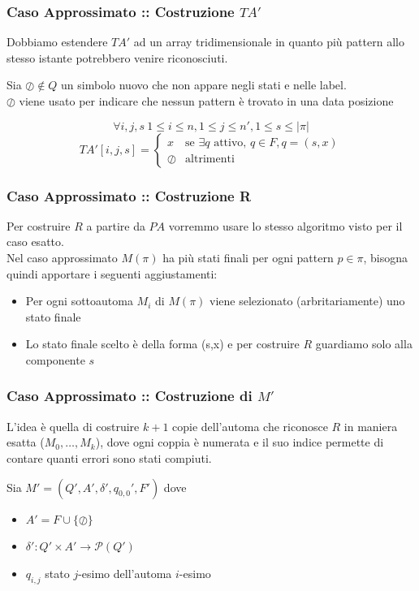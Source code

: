 \documentclass{beamer}
\begin{document}
\begin{frame}
\frametitle{Caso Approssimato :: Costruzione $TA'$}
Dobbiamo estendere $TA'$ ad un array tridimensionale in quanto più pattern allo stesso istante potrebbero venire riconosciuti.\\
\begin{definition}
Sia $\oslash \not\in Q$ un simbolo nuovo che non appare negli stati e nelle label. \\
$\oslash$ viene usato per indicare che nessun pattern è trovato in una data posizione
\end{definition}

\begin{equation*}
\forall  i,j,s\ 1\leq i \leq n, 1 \leq j \leq n',1 \leq s \leq |\pi|
\end{equation*}
\begin{equation*}
TA'[i,j,s]= 
\begin{cases} 
x & \text{se $\exists q$ attivo, $q\in F, q = (s,x)$}
\\
\oslash  &\text{altrimenti}
\end{cases}
\end{equation*}
\end{frame}


\begin{frame}
\frametitle{Caso Approssimato :: Costruzione R}

Per costruire $R$ a partire da $PA$ vorremmo usare lo stesso algoritmo visto per il caso esatto.\\
Nel caso approssimato $M(\pi)$ ha più stati finali per ogni pattern $p \in \pi$, bisogna quindi apportare i seguenti aggiustamenti:
\begin{itemize}
\item Per ogni sottoautoma $M_i$ di $M(\pi)$ viene selezionato (arbritariamente) uno stato finale
\item Lo stato finale scelto è della forma (s,x) e per costruire $R$ guardiamo solo alla componente $s$
\end{itemize}

\end{frame}


\begin{frame}
\frametitle{Caso Approssimato :: Costruzione di $M'$ }

L'idea è quella di costruire $k+1$ copie dell'automa che riconosce $R$ in maniera esatta ($M_0,\dots,M_k$), dove ogni coppia è numerata e il suo indice permette di contare quanti errori sono stati compiuti.
\begin{definition}
Sia $M' = (Q',A',\delta',q_{0,0}', F')$ dove
	\begin{itemize}
		\item $A' = F \cup \{\oslash\}$
		\item $\delta' : Q' \times A' \to \mathcal{P}(Q')$
		\item $q_{i,j}$ stato $j$-esimo dell'automa $i$-esimo
	\end{itemize}
\end{definition}





\end{frame}
\end{document}
